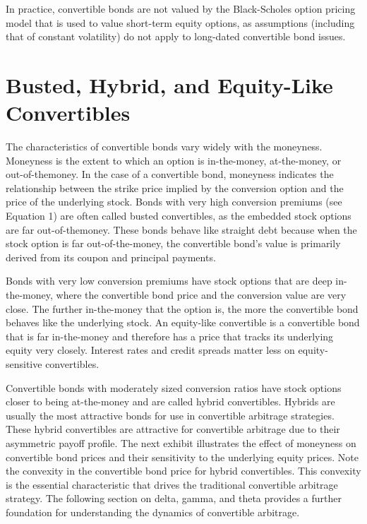 \documentclass[11pt]{article}
\begin{document}
In practice, convertible bonds are not valued by the Black-Scholes option pricing model that is used to value short-term equity options, as assumptions (including that of constant volatility) do not apply to long-dated convertible bond issues.

\section*{Busted, Hybrid, and Equity-Like Convertibles}
The characteristics of convertible bonds vary widely with the moneyness. Moneyness is the extent to which an option is in-the-money, at-the-money, or out-of-themoney. In the case of a convertible bond, moneyness indicates the relationship between the strike price implied by the conversion option and the price of the underlying stock. Bonds with very high conversion premiums (see Equation 1) are often called busted convertibles, as the embedded stock options are far out-of-themoney. These bonds behave like straight debt because when the stock option is far out-of-the-money, the convertible bond's value is primarily derived from its coupon and principal payments.

Bonds with very low conversion premiums have stock options that are deep in-the-money, where the convertible bond price and the conversion value are very close. The further in-the-money that the option is, the more the convertible bond behaves like the underlying stock. An equity-like convertible is a convertible bond that is far in-the-money and therefore has a price that tracks its underlying equity very closely. Interest rates and credit spreads matter less on equity-sensitive convertibles.

Convertible bonds with moderately sized conversion ratios have stock options closer to being at-the-money and are called hybrid convertibles. Hybrids are usually the most attractive bonds for use in convertible arbitrage strategies. These hybrid convertibles are attractive for convertible arbitrage due to their asymmetric payoff profile. The next exhibit illustrates the effect of moneyness on convertible bond prices and their sensitivity to the underlying equity prices. Note the convexity in the convertible bond price for hybrid convertibles. This convexity is the essential characteristic that drives the traditional convertible arbitrage strategy. The following section on delta, gamma, and theta provides a further foundation for understanding the dynamics of convertible arbitrage.
\end{document}
